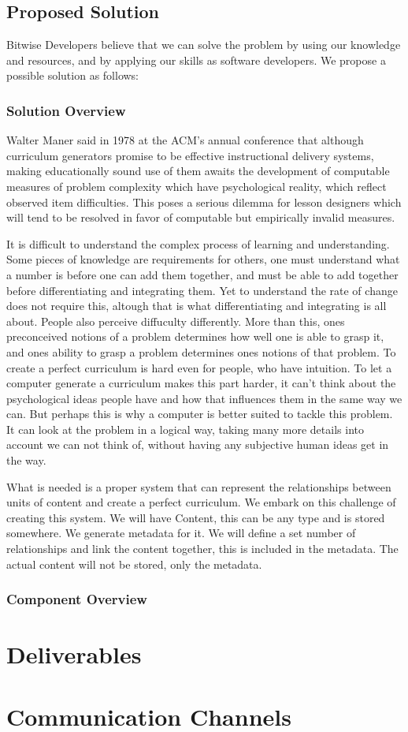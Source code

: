\documentclass[a4paper]{article}
\begin{document}
		\subsection{Proposed Solution}

Bitwise Developers believe that we can solve the problem by using our knowledge and resources, and by applying our skills as software developers. We propose a possible solution as follows:

			\subsubsection{Solution Overview}
Walter Maner said in 1978 at the ACM's annual conference that although curriculum generators promise to be effective instructional delivery systems, making educationally sound use of them awaits the development of computable measures of problem complexity which have psychological reality, which reflect observed item difficulties. This poses a serious dilemma for lesson designers which will tend to be resolved in favor of computable but empirically invalid measures.

It is difficult to understand the complex process of learning and understanding. Some pieces of knowledge are requirements for others, one must understand what a number is before one can add them together, and must be able to add together before differentiating and integrating them. Yet to understand the rate of change does not require this, altough that is what differentiating and integrating is all about. People also perceive diffuculty differently. More than this, ones preconceived notions of a problem determines how well one is able to grasp it, and ones ability to grasp a problem determines ones notions of that problem. To create a perfect curriculum is hard even for people, who have intuition. To let a computer generate a curriculum makes this part harder, it can't think about the psychological ideas people have and how that influences them in the same way we can. But perhaps this is why a computer is better suited to tackle this problem. It can look at the problem in a logical way, taking many more details into account we can not think of, without having any subjective human ideas get in the way.

What is needed is a proper system that can represent the relationships between units of content and create a perfect curriculum. We embark on this challenge of creating this system. We will have Content, this can be any type and is stored somewhere. We generate metadata for it. We will define a set number of relationships and link the content together, this is included in the metadata. The actual content will not be stored, only the metadata.


			\subsubsection{Component Overview}

	\section{Deliverables}

	\section{Communication Channels}
\end{document}
